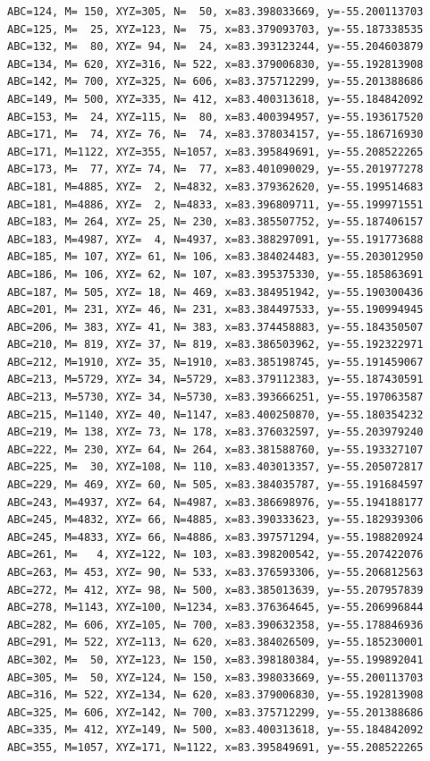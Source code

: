 \documentclass{article}
\begin{document}
\begin{enumerate}
\begin{verbatim}
ABC=124, M= 150, XYZ=305, N=  50, x=83.398033669, y=-55.200113703
ABC=125, M=  25, XYZ=123, N=  75, x=83.379093703, y=-55.187338535
ABC=132, M=  80, XYZ= 94, N=  24, x=83.393123244, y=-55.204603879
ABC=134, M= 620, XYZ=316, N= 522, x=83.379006830, y=-55.192813908
ABC=142, M= 700, XYZ=325, N= 606, x=83.375712299, y=-55.201388686
ABC=149, M= 500, XYZ=335, N= 412, x=83.400313618, y=-55.184842092
ABC=153, M=  24, XYZ=115, N=  80, x=83.400394957, y=-55.193617520
ABC=171, M=  74, XYZ= 76, N=  74, x=83.378034157, y=-55.186716930
ABC=171, M=1122, XYZ=355, N=1057, x=83.395849691, y=-55.208522265
ABC=173, M=  77, XYZ= 74, N=  77, x=83.401090029, y=-55.201977278
ABC=181, M=4885, XYZ=  2, N=4832, x=83.379362620, y=-55.199514683
ABC=181, M=4886, XYZ=  2, N=4833, x=83.396809711, y=-55.199971551
ABC=183, M= 264, XYZ= 25, N= 230, x=83.385507752, y=-55.187406157
ABC=183, M=4987, XYZ=  4, N=4937, x=83.388297091, y=-55.191773688
ABC=185, M= 107, XYZ= 61, N= 106, x=83.384024483, y=-55.203012950
ABC=186, M= 106, XYZ= 62, N= 107, x=83.395375330, y=-55.185863691
ABC=187, M= 505, XYZ= 18, N= 469, x=83.384951942, y=-55.190300436
ABC=201, M= 231, XYZ= 46, N= 231, x=83.384497533, y=-55.190994945
ABC=206, M= 383, XYZ= 41, N= 383, x=83.374458883, y=-55.184350507
ABC=210, M= 819, XYZ= 37, N= 819, x=83.386503962, y=-55.192322971
ABC=212, M=1910, XYZ= 35, N=1910, x=83.385198745, y=-55.191459067
ABC=213, M=5729, XYZ= 34, N=5729, x=83.379112383, y=-55.187430591
ABC=213, M=5730, XYZ= 34, N=5730, x=83.393666251, y=-55.197063587
ABC=215, M=1140, XYZ= 40, N=1147, x=83.400250870, y=-55.180354232
ABC=219, M= 138, XYZ= 73, N= 178, x=83.376032597, y=-55.203979240
ABC=222, M= 230, XYZ= 64, N= 264, x=83.381588760, y=-55.193327107
ABC=225, M=  30, XYZ=108, N= 110, x=83.403013357, y=-55.205072817
ABC=229, M= 469, XYZ= 60, N= 505, x=83.384035787, y=-55.191684597
ABC=243, M=4937, XYZ= 64, N=4987, x=83.386698976, y=-55.194188177
ABC=245, M=4832, XYZ= 66, N=4885, x=83.390333623, y=-55.182939306
ABC=245, M=4833, XYZ= 66, N=4886, x=83.397571294, y=-55.198820924
ABC=261, M=   4, XYZ=122, N= 103, x=83.398200542, y=-55.207422076
ABC=263, M= 453, XYZ= 90, N= 533, x=83.376593306, y=-55.206812563
ABC=272, M= 412, XYZ= 98, N= 500, x=83.385013639, y=-55.207957839
ABC=278, M=1143, XYZ=100, N=1234, x=83.376364645, y=-55.206996844
ABC=282, M= 606, XYZ=105, N= 700, x=83.390632358, y=-55.178846936
ABC=291, M= 522, XYZ=113, N= 620, x=83.384026509, y=-55.185230001
ABC=302, M=  50, XYZ=123, N= 150, x=83.398180384, y=-55.199892041
ABC=305, M=  50, XYZ=124, N= 150, x=83.398033669, y=-55.200113703
ABC=316, M= 522, XYZ=134, N= 620, x=83.379006830, y=-55.192813908
ABC=325, M= 606, XYZ=142, N= 700, x=83.375712299, y=-55.201388686
ABC=335, M= 412, XYZ=149, N= 500, x=83.400313618, y=-55.184842092
ABC=355, M=1057, XYZ=171, N=1122, x=83.395849691, y=-55.208522265
\end{verbatim}



\end{enumerate}
\end{document}
